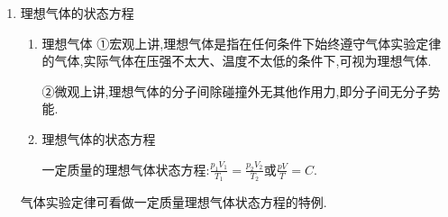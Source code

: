 \begin{enumerate}
\item 
理想气体的状态方程
\begin{enumerate}
\renewcommand{\labelenumi}{\arabic{enumi}.}
\item
理想气体
①宏观上讲,理想气体是指在任何条件下始终遵守气体实验定律的气体,实际气体在压强不太大、温度不太低的条件下,可视为理想气体.

②微观上讲,理想气体的分子间除碰撞外无其他作用力,即分子间无分子势能.
\item 
理想气体的状态方程

一定质量的理想气体状态方程:$\frac { p _ { 1 } V _ { 1 } } { T _ { 1 } } = \frac { p _ { 2 } V _ { 2 } } { T _ { 2 } }$或$\frac { p V } { T } = C$.




\end{enumerate}	

气体实验定律可看做一定质量理想气体状态方程的特例.	
\end{enumerate}


